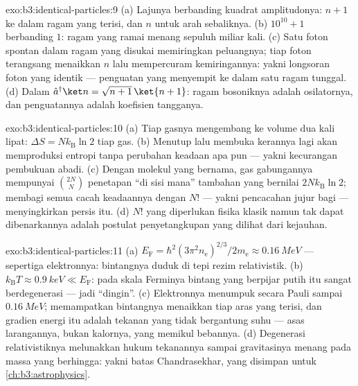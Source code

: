 \begin{solution}{exo:b3:identical-particles:9}
(a) Lajunya berbanding kuadrat amplitudonya: $n + 1$ ke dalam ragam yang
terisi, dan $n$ untuk arah sebaliknya. (b) $10^{10} + 1$ berbanding $1$:
ragam yang ramai menang sepuluh miliar kali. (c) Satu foton spontan
dalam ragam yang disukai memiringkan peluangnya; tiap foton terangsang
menaikkan $n$ lalu mempercuram kemiringannya: yakni longsoran foton yang
identik --- penguatan yang menyempit ke dalam satu ragam tunggal. (d)
Dalam $\hat a^\dagger\ket n =
\sqrt{n+1}\,\ket{n+1}$: ragam bosoniknya adalah osilatornya, dan
penguatannya adalah koefisien tangganya.
\end{solution}

\begin{solution}{exo:b3:identical-particles:10}
(a) Tiap gasnya mengembang ke volume dua kali lipat: $\Delta S =
Nk_{\text{B}}\ln2$ tiap gas. (b) Menutup lalu membuka kerannya lagi
akan memproduksi entropi tanpa perubahan keadaan apa pun --- yakni
kecurangan pembukuan abadi. (c) Dengan molekul yang bernama, gas
gabungannya mempunyai $\binom{2N}{N}$ penetapan ``di sisi mana''
tambahan yang bernilai $2Nk_{\text{B}}\ln2$; membagi semua cacah
keadaannya dengan $N!$ --- yakni pencacahan jujur bagi 
--- menyingkirkan persis itu.
(d) $N!$ yang diperlukan fisika klasik namun tak dapat dibenarkannya
adalah postulat penyetangkupan yang dilihat dari kejauhan.
\end{solution}

\begin{solution}{exo:b3:identical-particles:11}
(a) $E_{\text{F}} = \hbar^2(3\pi^2n_{\text{e}})^{2/3}/2m_{\text{e}}
\approx \qty{0.16}{MeV}$ --- sepertiga  elektronnya:
bintangnya duduk di tepi rezim relativistik. (b)
$k_{\text{B}}T \approx \qty{0.9}{keV} \ll E_{\text{F}}$: pada skala
Ferminya bintang yang berpijar putih itu sangat berdegenerasi --- jadi
``dingin''.
(c) Elektronnya menumpuk secara Pauli sampai
$\qty{0.16}{MeV}$; memampatkan bintangnya menaikkan tiap aras yang
terisi, dan gradien energi itu adalah tekanan yang tidak bergantung
suhu --- asas larangannya, bukan kalornya, yang memikul bebannya. (d)
Degenerasi relativistiknya melunakkan hukum tekanannya sampai
gravitasinya menang pada massa yang berhingga: yakni batas
Chandrasekhar, yang disimpan untuk \cref{ch:b3:astrophysics}.
\end{solution}

